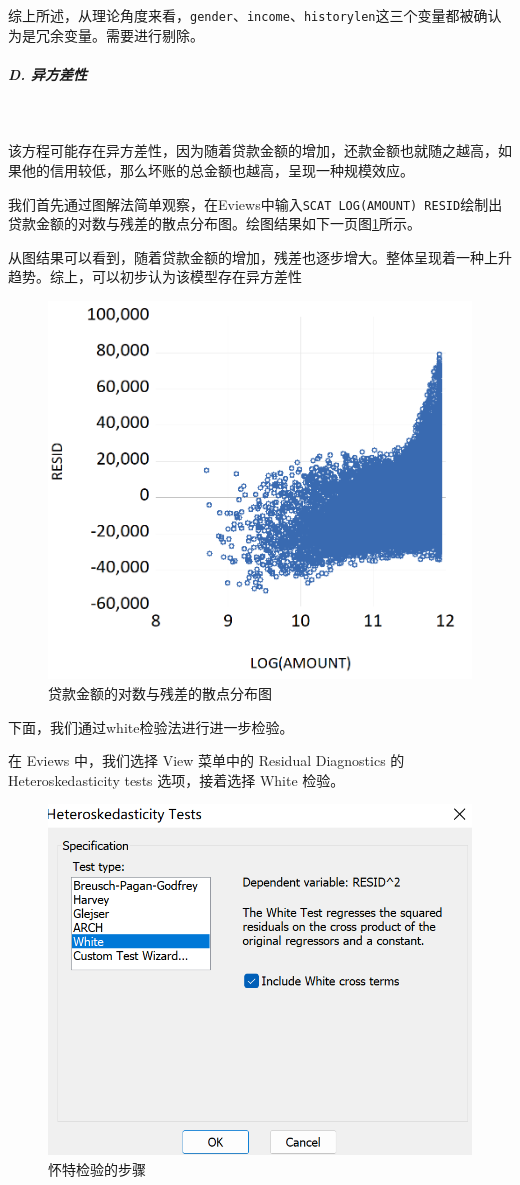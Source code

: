 \documentclass[13.5pt,hyperref,a4paper,UTF8]{ctexart}
\begin{document}
综上所述，从理论角度来看，\texttt{gender}、\texttt{income}、\texttt{historylen}这三个变量都被确认为是冗余变量。需要进行剔除。


\subparagraph {D. 异方差性}
\

该方程可能存在异方差性，因为随着贷款金额的增加，还款金额也就随之越高，如果他的信用较低，那么坏账的总金额也越高，呈现一种规模效应。

我们首先通过图解法简单观察，在Eviews中输入\texttt{SCAT LOG(AMOUNT) RESID}绘制出贷款金额的对数与残差的散点分布图。绘图结果如下一页图\ref{贷款金额的对数与残差的散点分布图}所示。

从图结果可以看到，随着贷款金额的增加，残差也逐步增大。整体呈现着一种上升趋势。综上，可以初步认为该模型存在异方差性

\begin{figure}[H]
    \centering
    \includegraphics[width=0.75\linewidth]{figures//3回归//回归2/resid散点图.png}
    \caption{贷款金额的对数与残差的散点分布图}
    \label{贷款金额的对数与残差的散点分布图}
\end{figure}

下面，我们通过white检验法进行进一步检验。

在 Eviews 中，我们选择 View 菜单中的 Residual Diagnostics 的 Heteroskedasticity tests 选项，接着选择 White 检验。

\begin{figure}[H]
    \centering
    \includegraphics[width=0.55\linewidth]{figures//3回归//回归2/怀特检验的步骤.png}
    \caption{怀特检验的步骤}
    \label{怀特检验的步骤}
\end{figure}
\end{document}
